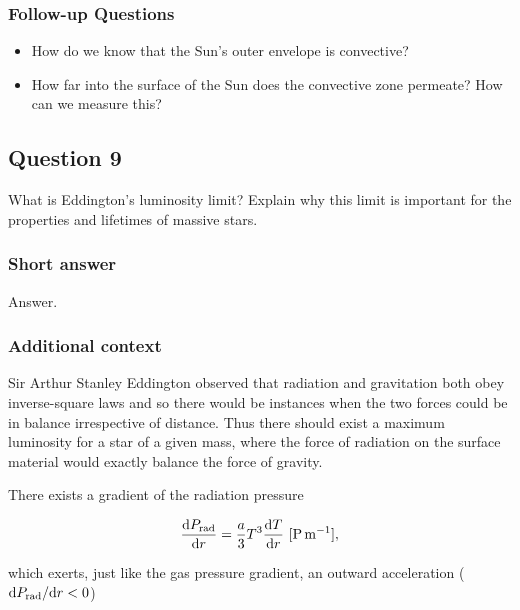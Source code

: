 \documentclass[a4paper,10pt]{article}
\begin{document}
\subsubsection{Follow-up Questions}

\begin{itemize}
    \item How do we know that the Sun's outer envelope is convective?
    \item How far into the surface of the Sun does the convective zone permeate? How can we measure this?
\end{itemize}


\newpage
\subsection{Question 9}

What is Eddington's luminosity limit? Explain why this limit is important for the properties and lifetimes of massive stars.

\subsubsection{Short answer}

Answer.

\subsubsection{Additional context}

Sir Arthur Stanley Eddington observed that radiation and gravitation both obey inverse-square laws and so there would be instances when the two forces could be in balance irrespective of distance. Thus there should exist a maximum luminosity for a star of a given mass, where the force of radiation on the surface material would exactly balance the force of gravity.

{\noindent}There exists a gradient of the radiation pressure

\begin{align*}
    \frac{{\rm d}P_{\rm rad}}{{\rm d}r} = \frac{a}{3}T^3\frac{{\rm d}T}{{\rm d}r} ~ [{\rm P\,m^{-1}}],
\end{align*}

{\noindent}which exerts, just like the gas pressure gradient, an outward acceleration (${\rm d}P_{\rm rad}/{\rm d}r<0$)
\end{document}
